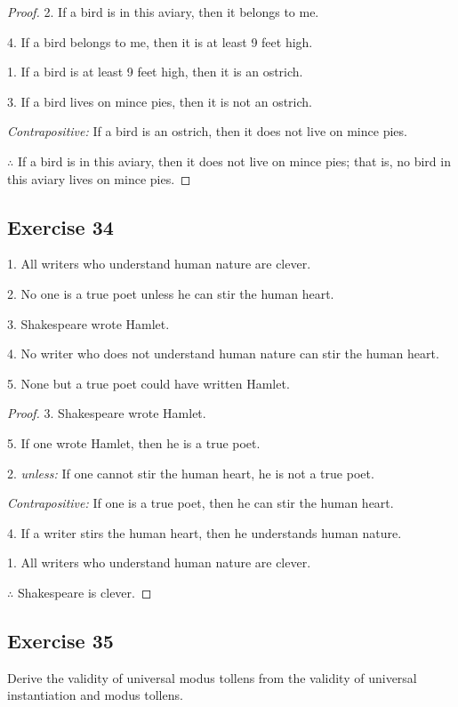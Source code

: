 \documentclass[14pt]{extarticle}
\begin{document}
\begin{proof}
    2. If a bird is in this aviary, then it belongs to me.

    4. If a bird belongs to me, then it is at least 9 feet high.

    1. If a bird is at least 9 feet high, then it is an ostrich.

    3. If a bird lives on mince pies, then it is not an ostrich.

        {\it Contrapositive:} If a bird is an ostrich, then it does not live on mince pies.

    $\therefore$ If a bird is in this aviary, then it does not live on mince pies; that is, no bird in this aviary lives on mince pies.
\end{proof}

\subsection{Exercise 34}
1. All writers who understand human nature are clever.

2. No one is a true poet unless he can stir the human heart.

3. Shakespeare wrote Hamlet.

4. No writer who does not understand human nature can stir the human heart.

5. None but a true poet could have written Hamlet.

\begin{proof}
    3. Shakespeare wrote Hamlet.

    5. If one wrote Hamlet, then he is a true poet.

    2. {\it unless:} If one cannot stir the human heart, he is not a true poet.

        {\it Contrapositive:} If one is a true poet, then he can stir the human heart.

    4. If a writer stirs the human heart, then he understands human nature.

    1. All writers who understand human nature are clever.

    $\therefore$ Shakespeare is clever.
\end{proof}

\subsection{Exercise 35}
Derive the validity of universal modus tollens from the validity of universal instantiation and modus tollens.
\end{document}
